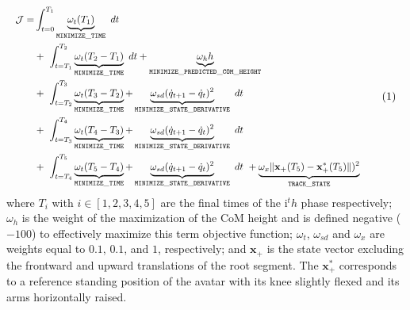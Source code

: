 \[ 
\resizebox{0.9\columnwidth}{!}{$ 
\begin{aligned}
\mathcal{J} = 
  &\int_{t=0}^{T_1}\underbrace{\omega_{t} (T_1)}_{\mathtt{MINIMIZE\_TIME}}~dt\\
  &+~\int_{t=T_1}^{T_2}\underbrace{\omega_{t} (T_2 - T_1)}_{\mathtt{MINIMIZE\_TIME}}~dt + \underbrace{\omega_h h}_{\mathtt{MINIMIZE\_PREDICTED\_COM\_HEIGHT}}\\
  &+~\int_{t=T_2}^{T_3}\underbrace{\omega_{t} (T_3 - T_2)}_{\mathtt{MINIMIZE\_TIME}} + \underbrace{\omega_{sd} (\dot{q}_{t+1} - \dot{q}_t)^2}_{\mathtt{MINIMIZE\_STATE\_DERIVATIVE}}~dt\\
  &+~\int_{t=T_3}^{T_4}\underbrace{\omega_{t} (T_4 - T_3)}_{\mathtt{MINIMIZE\_TIME}} + \underbrace{\omega_{sd} (\dot{q}_{t+1} - \dot{q}_t)^2}_{\mathtt{MINIMIZE\_STATE\_DERIVATIVE}}~dt\\
  &+~\int_{t=T_4}^{T_5}\underbrace{\omega_{t} (T_5 - T_4)}_{\mathtt{MINIMIZE\_TIME}} + \underbrace{\omega_{sd} (\dot{q}_{t+1} - \dot{q}_t)^2}_{\mathtt{MINIMIZE\_STATE\_DERIVATIVE}}~dt~+ \underbrace{\omega_{x} \| \mathbf{x}_+(T_5) - \mathbf{x}_+^*(T_5)\| )^2}_{\mathtt{TRACK\_STATE}}\\
\end{aligned} 
$}  
\addtag  
\label{eq:cost_jumper}
\]
where $T_i$ with $i \in [1, 2, 3, 4, 5]$ are the final times of the i$^th$ phase respectively; 
$\omega_h$ is the weight of the maximization of the CoM height and is defined negative ($-100$) to effectively maximize this term objective function; 
$\omega_t$, $\omega_{sd}$ and $\omega_x$ are weights equal to $0.1$, $0.1$, and $1$, respectively; 
and $\mathbf{x}_+$ is the state vector excluding the frontward and upward translations of the root segment. 
The $\mathbf{x}_+^*$ corresponds to a reference standing position of the avatar with its knee slightly flexed and its arms horizontally raised.



